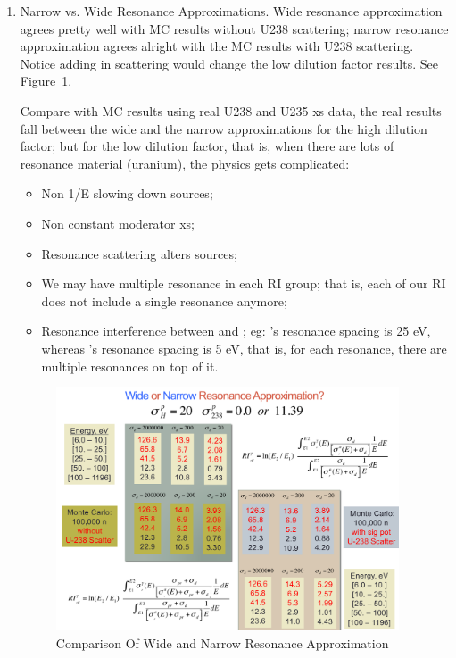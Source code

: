 \documentclass{school-22.211-notes}
\begin{document}
\begin{enumerate}
\item Narrow vs. Wide Resonance Approximations\label{narrow-wide-compr}. 
Wide resonance approximation agrees pretty well with MC results without U238 scattering; narrow resonance approximation agrees alright with the MC results with U238 scattering. Notice adding in scattering would change the low dilution factor results. See Figure~\ref{wide-vs-narrow}.

Compare with MC results using real U238 and U235 xs data, the real results fall between the wide and the narrow approximations for the high dilution factor; but for the low dilution factor, that is, when there are lots of resonance material (uranium), the physics gets complicated: 
\begin{itemize}
\item Non 1/E slowing down sources;
\item Non constant moderator xs;
\item Resonance scattering alters sources;
\item We may have multiple resonance in each RI group; that is, each of our RI does not include a single resonance anymore;
\item Resonance interference between  and ; eg: 's resonance spacing is 25 eV, whereas 's resonance spacing is 5 eV, that is, for each  resonance, there are multiple  resonances on top of it. 
\end{itemize}
\begin{figure}
  \centering
  \includegraphics[width=4in]{images/r-m/narrow-vs-wide-resonance.png}
  \caption{Comparison Of Wide and Narrow Resonance Approximation} \label{wide-vs-narrow}
\end{figure}


\end{enumerate}
\end{document}
